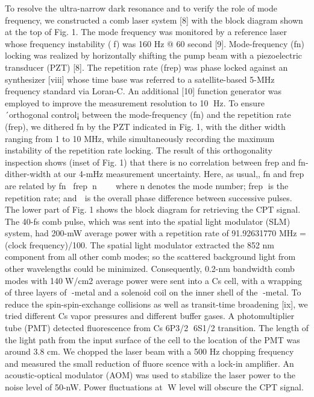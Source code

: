 \documentclass[%
reprint,  
aps,
prl,
showpacs,
]{revtex4}
\begin{document}
To resolve the ultra-narrow dark resonance and to verify the role of mode 
frequency, we constructed a comb laser system [8] with the block diagram shown 
at the top of Fig. 1. The mode frequency was monitored by a reference laser 
whose frequency instability (f) was 160 Hz @ 60 second [9]. Mode-frequency (fn) 
locking was realized by horizontally shifting the pump beam with a piezoelectric 
transducer (PZT) [8]. The repetition rate (frep) was phase locked against an 
synthesizer [viii] whose time base was referred to a satellite-based 5-MHz 
frequency standard via Loran-C. An additional [10] function generator was employed 
to improve the measurement resolution to 10 Hz. To ensure ´orthogonal control¡ 
between the mode-frequency (fn) and the repetition rate (frep), we dithered fn 
by the PZT indicated in Fig. 1, with the dither width ranging from 1 to 10 MHz, 
while simultaneously recording the maximum instability of the repetition rate 
locking. The result of this orthogonality inspection shows (inset of Fig. 1) 
that there is no correlation between frep and fn-dither-width at our 4-mHz measurement 
uncertainty. Here, as usual,, fn and frep are related by fnfrepnwhere 
n denotes the mode number; frep is the repetition rate; and  is the overall phase 
difference between successive pulses. The lower part of Fig. 1 shows the block 
diagram for retrieving the CPT signal. The 40-fs comb pulse, which was sent into
 the spatial light modulator (SLM) system, had 200-mW average power with a 
repetition rate of 91.92631770 MHz = (clock frequency)/100. The spatial light 
modulator extracted the 852 nm component from all other comb modes; so the scattered 
background light from other wavelengths could be minimized. Consequently, 0.2-nm 
bandwidth comb modes with 140W/cm2 average power were sent into a Cs cell, 
with a wrapping of three layers of -metal and a solenoid coil on the inner 
shell of the -metal. To reduce the spin-spin-exchange collisions as well as 
transit-time broadening [ix], we tried different Cs vapor pressures and different 
buffer gases. A photomultiplier tube (PMT) detected fluorescence from
 Cs 6P3/2 6S1/2 transition. The length of the light path from the input surface 
of the cell to the location of the PMT was around 3.8 cm. We chopped the laser 
beam with a 500 Hz chopping frequency and measured the small reduction of fluore
scence with a lock-in amplifier. An acoustic-optical modulator (AOM) was used to 
stabilize the laser power to the noise level of 50-nW. Power fluctuations at W 
level will obscure the CPT signal.
\end{document}
